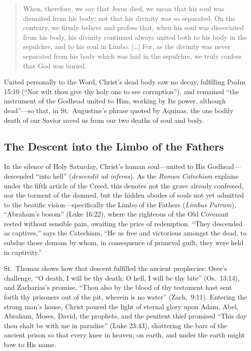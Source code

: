 \begin{quote}
When, therefore, we say that Jesus died, we mean that his soul was disunited from his body; not that his divinity was so separated. On the contrary, we firmly believe and profess that, when his soul was dissociated from his body, his divinity continued always united both to his body in the sepulchre, and to his soul in Limbo. [\ldots] For, as the divinity was never separated from his body which was laid in the sepulchre, we truly confess that God was buried.
\end{quote}

United personally to the Word, Christ's dead body saw no decay, fulfilling Psalm 15:10 (``Nor wilt thou give thy holy one to see corruption''), and remained ``the instrument of the Godhead united to Him, working by Its power, although dead''---so that, in St.~Augustine's phrase quoted by Aquinas, the one bodily death of our Savior saved us from our two deaths of soul and body.

\subsection{The Descent into the Limbo of the Fathers}

In the silence of Holy Saturday, Christ's human soul---united to His Godhead---descended ``into hell'' (\emph{descendit ad inferos}). As the \emph{Roman Catechism} explains under the fifth article of the Creed, this denotes not the grave already confessed, nor the torment of the damned, but the hidden abodes of souls not yet admitted to the beatific vision---specifically the Limbo of the Fathers (\emph{Limbus Patrum}), ``Abraham's bosom'' (Luke 16:22), where the righteous of the Old Covenant rested without sensible pain, awaiting the price of redemption. ``They descended as captives,'' says the Catechism, ``He as free and victorious amongst the dead, to subdue those demons by whom, in consequence of primeval guilt, they were held in captivity.''

St.~Thomas shows how that descent fulfilled the ancient prophecies: Osee's challenge, ``O death, I will be thy death; O hell, I will be thy bite'' (Os.\ 13:14), and Zacharias's promise, ``Thou also by the blood of thy testament hast sent forth thy prisoners out of the pit, wherein is no water'' (Zach.\ 9:11). Entering the strong man's house, Christ poured the light of eternal glory upon Adam, Abel, Abraham, Moses, David, the prophets, and the penitent thief promised ``This day thou shalt be with me in paradise'' (Luke 23:43), shattering the bars of the ancient prison so that every knee in heaven, on earth, and under the earth might bow to His name.

